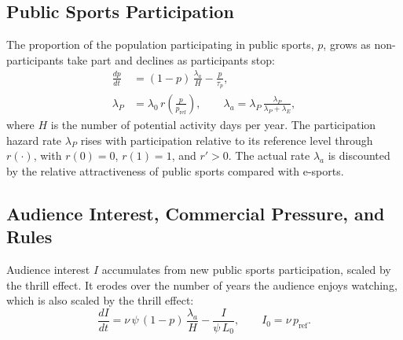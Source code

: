 
\subsection{Public Sports Participation}
\label{sec:model:participation}

The proportion of the population participating in public sports, $p$,
grows as non-participants take part and declines as participants
stop:
\begin{align}
  \frac{dp}{dt} &= (1 - p)\,\frac{\lambda_a}{H} - \frac{p}{\tau_p},
  \label{eq:p}\\[4pt]
  \lambda_P &= \lambda_0\, r\!\left(\frac{p}{p_{\mathrm{ref}}}\right),
  \qquad
  \lambda_a = \lambda_P \,\frac{\lambda_P}{\lambda_P + \lambda_E},
  \label{eq:lambda}
\end{align}
where $H$ is the number of potential activity days per year. The
participation hazard rate $\lambda_P$ rises with participation
relative to its reference level through $r(\cdot)$, with $r(0)=0$,
$r(1)=1$, and $r'>0$. The actual rate $\lambda_a$ is discounted by the
relative attractiveness of public sports compared with e-sports.

\subsection{Audience Interest, Commercial Pressure, and Rules}
\label{sec:model:interest}

Audience interest $I$ accumulates from new public sports participation,
scaled by the thrill effect. It erodes over the number of years the
audience enjoys watching, which is also scaled by the thrill effect:
\begin{equation}
  \frac{dI}{dt} = \nu\, \psi\, (1 - p)\,\frac{\lambda_a}{H}
                  - \frac{I}{\psi\, L_0},
  \qquad I_0 = \nu\, p_{\mathrm{ref}} .
  \label{eq:I}
\end{equation}


